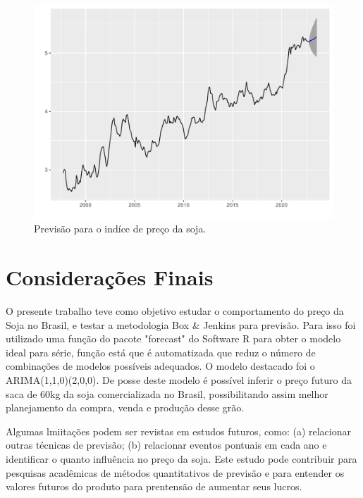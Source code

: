 \documentclass[
	12pt,				%
	openright,			%
	oneside,      %
	a4paper,			%
	english,			%
	french,				%
	spanish,			%
	brazil,				%
	]{abntex2}\usepackage[]{graphicx}\usepackage[table]{xcolor}
\makeatletter
\def\maxwidth{ %
  \ifdim\Gin@nat@width>\linewidth
    \linewidth
  \else
    \Gin@nat@width
  \fi
}
\newenvironment{knitrout}{}{} %
\theoremstyle{definition}
\theoremstyle{remark}
\makeatother
\begin{document}
\begin{knitrout}
\color{fgcolor}\begin{figure}
\includegraphics[width=\maxwidth]{figure/script12-1} \caption[Previsão para o indíce de preço da soja]{Previsão para o indíce de preço da soja.\label{fig12}}\label{fig:script12}
\end{figure}

\end{knitrout}





\chapter{Considerações Finais}

O presente trabalho teve como objetivo estudar o comportamento do preço da Soja no Brasil, e testar a metodologia Box \& Jenkins para previsão. Para isso foi utilizado uma função do pacote "forecast" do Software R para obter o modelo ideal para série, função está que é automatizada que reduz o número de combinações de modelos possíveis adequados. O modelo destacado foi o ARIMA(1,1,0)(2,0,0). De posse deste modelo é possível inferir o preço futuro da saca de 60kg da soja comercializada no Brasil, possibilitando assim melhor planejamento da compra, venda e produção desse grão.

Algumas lmiitações podem ser revistas em estudos futuros, como: (a) relacionar outras técnicas de previsão; (b) relacionar eventos pontuais em cada ano e identificar o quanto influência no preço da soja. Este estudo pode contribuir para pesquisas acadêmicas de métodos quantitativos de previsão e para entender os valores futuros do produto para prentensão de aumentar seus lucros. 
\end{document}
